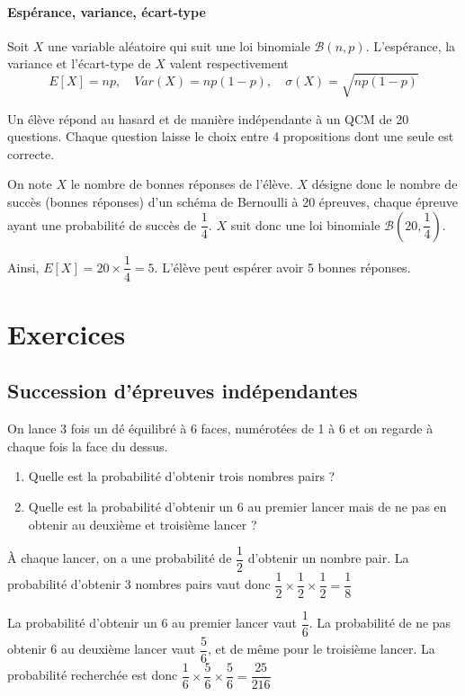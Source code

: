 \documentclass[11pt,fleqn, openany]{book} %
\begin{document}
\subsubsection{Espérance, variance, écart-type}

\begin{proposition}Soit $X$ une variable aléatoire qui suit une loi binomiale $\mathcal{B}(n,p)$. L'espérance, la variance et l'écart-type de $X$ valent respectivement \[E[X]=np, \quad Var(X)=np(1-p), \quad \sigma(X)=\sqrt{np(1-p)}\]\end{proposition}

\begin{example}Un élève répond au hasard et de manière indépendante à un QCM de 20 questions. Chaque question laisse le choix entre 4 propositions dont une seule est correcte.

On note $X$ le nombre de bonnes réponses de l'élève. $X$ désigne donc le nombre de succès (bonnes réponses) d'un schéma de Bernoulli à 20 épreuves, chaque épreuve ayant une probabilité de succès de $\dfrac{1}{4}$. $X$ suit donc une loi binomiale $\mathcal{B}\left(20,\dfrac{1}{4}\right)$.

Ainsi, $E[X]=20 \times \dfrac{1}{4}=5$. L'élève peut espérer avoir 5 bonnes réponses.\end{example}


\chapter{Exercices}

\section*{Succession d'épreuves indépendantes}

\begin{exercise}[topic=prob11]On lance 3 fois un dé équilibré à 6 faces, numérotées de 1 à 6 et on regarde à chaque fois la face du dessus.
\begin{enumerate}
\item Quelle est la probabilité d'obtenir trois nombres pairs ?
\item Quelle est la probabilité d'obtenir un 6 au premier lancer mais de ne pas en obtenir au deuxième et troisième lancer ?
\end{enumerate}\end{exercise}

\begin{solution}À chaque lancer, on a une probabilité de $\dfrac{1}{2}$ d'obtenir un nombre pair. La probabilité d'obtenir 3 nombres pairs vaut donc $\dfrac{1}{2} \times \dfrac{1}{2} \times \dfrac{1}{2}= \dfrac{1}{8}$

La probabilité d'obtenir un 6 au premier lancer vaut $\dfrac{1}{6}$. La probabilité de ne pas obtenir 6 au deuxième lancer vaut $\dfrac{5}{6}$, et de même pour le troisième lancer. La probabilité recherchée est donc $\dfrac{1}{6} \times \dfrac{5}{6} \times \dfrac{5}{6}=\dfrac{25}{216}$
\end{solution}
\end{document}
